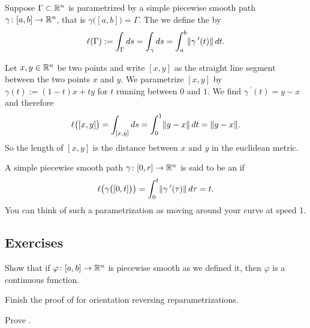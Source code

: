 \begin{defn}
Suppose $\Gamma \subset {\mathbb{R}}^n$ is parametrized by a simple
piecewise smooth path $\gamma \colon [a,b] \to {\mathbb{R}}^n$, that is
$\gamma\bigl( [a,b] \bigr) = \Gamma$.  The we define the
\emph{} by
\begin{equation*}
\ell(\Gamma) := \int_{\Gamma} ds = \int_{\gamma} ds = \int_a^b
\lVert {\gamma^{\:\prime}(t)} \rVert\, dt .
\end{equation*}
\end{defn}

\begin{example}
Let $x,y \in {\mathbb{R}}^n$ be two points and write $[x,y]$ as the straight line
segment between the two points $x$ and $y$.  We parametrize
$[x,y]$ by $\gamma(t) := (1-t)x + ty$ for $t$ running between $0$ and $1$.
We find $\gamma^{\:\prime}(t) = y-x$ and therefore
\begin{equation*}
\ell\bigl([x,y]\bigr)
=
\int_{[x,y]} ds
=
\int_0^1 \lVert {y-x} \rVert \, dt
=
\lVert {y-x} \rVert .
\end{equation*}
So the length of $[x,y]$ is the distance between $x$ and $y$ in the
euclidean metric.
\end{example}

A simple piecewise smooth path $\gamma \colon [0,r] \to {\mathbb{R}}^n$ is
said to be an \emph{} if
\begin{equation*}
\ell\bigl( \gamma\bigl([0,t]\bigr) \bigr) = \int_0^t
\lVert {\gamma^{\:\prime}(\tau)} \rVert
\, d\tau  = t .
\end{equation*}
You can think of such a parametrization as moving around your curve at speed
1.


\subsection{Exercises}

\begin{exercise}
Show that if $\varphi \colon [a,b] \to {\mathbb{R}}^n$ is piecewise smooth as we
defined it, then $\varphi$ is a continuous function.
\end{exercise}

\begin{exercise}
Finish the proof of  for orientation
reversing reparametrizations.
\end{exercise}

\begin{exercise}
Prove .
\end{exercise}


